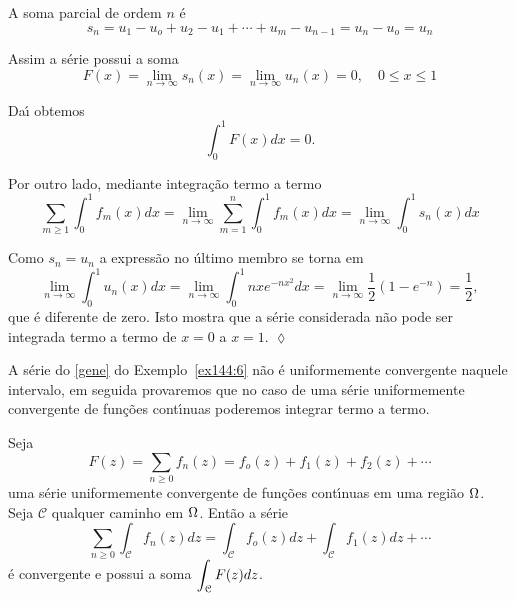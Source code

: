 \solo A soma parcial de ordem $n$ \'{e}
\begin{equation*}
s_n=u_1-u_o+u_2-u_1+\cdots+u_m-u_{n-1}=u_n-u_o=u_n
\end{equation*}

Assim a s\'{e}rie possui a soma
\begin{equation*}
F(x) = \lim_{n\to \infty}s_n(x) = \lim_{n\to\infty}u_n(x) =
0,\quad 0\le x \le 1
\end{equation*}

Da\'{\i} obtemos
\begin{equation*}
\int_0^1F(x)dx = 0.
\end{equation*}

Por outro lado, mediante integra\c{c}\~{a}o termo a termo
\begin{equation*}
\sum_{m\geq 1}\int_0^1f_m(x)dx=\lim_{n\to\infty}\sum_{m=
1}^n\int_0^1f_m(x)dx=\lim_{n\to\infty}\int_0^1s_n(x)dx
\end{equation*}

Como $s_n =u_n$ a express\~{a}o no \'{u}ltimo membro se torna em
\begin{equation*}
\lim_{n\to\infty}\int_0^1u_n(x)dx=\lim_{n\to\infty}\int_0^1nxe^{-nx^2}dx=
\lim_{n\to\infty}\frac{1}{2}(1-e^{-n})=\frac{1}{2},
\end{equation*}
que \'{e} diferente de zero. Isto mostra que a s\'{e}rie considerada n\~{a}o
pode ser integrada termo a termo de $x =0$ a $x = 1$.\hfill
\(\lozenge\)

A s\'{e}rie do \eqref{gene} do Exemplo~\ref{ex144:6} n\~{a}o \'{e}
uniformemente convergente naquele intervalo, em seguida provaremos
que no caso de uma s\'{e}rie uniformemente convergente de fun\c{c}\~{o}es
cont\'{\i}nuas poderemos integrar termo a termo.

\begin{teo}\label{orf144:3}
Seja
\begin{equation*}
F(z) = \sum_{n\geq 0}f_n(z)=f_o(z)+f_1(z)+f_2(z)+\cdots
\end{equation*}
uma s\'{e}rie uniformemente convergente de fun\c{c}\~{o}es cont\'{\i}nuas em uma
regi\~{a}o $\Omega$. Seja $\mathcal{C}$ qualquer caminho em $\Omega$. Ent\~{a}o
a s\'{e}rie
\begin{equation}\label{form144:4}
\sum_{n\geq
0}\int_{\mathcal{C}}f_n(z)dz=\int_{\mathcal{C}}f_o(z)dz+\int_{\mathcal{C}}f_1(z)dz+\cdots
\end{equation}
\'{e} convergente e possui a soma $\displaystyle{\int_{\mathcal{C}}F(z)dz}$.
\end{teo}

